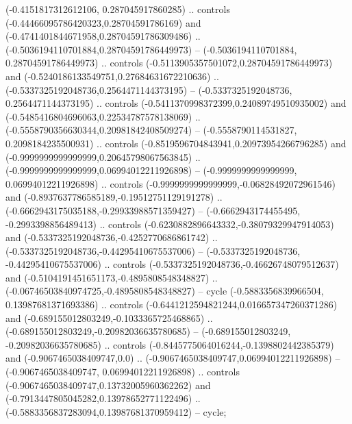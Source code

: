 (-0.4151817312612106, 0.287045917860285) .. controls (-0.44466095786420323,0.28704591786169) and (-0.4741401844671958,0.28704591786309486) .. (-0.5036194110701884,0.28704591786449973) --
(-0.5036194110701884, 0.28704591786449973) .. controls (-0.5113905357501072,0.28704591786449973) and (-0.5240186133549751,0.27684631672210636) .. (-0.5337325192048736,0.2564471144373195) --
(-0.5337325192048736, 0.2564471144373195) .. controls (-0.5411370998372399,0.24089749510935002) and (-0.5485416804696063,0.22534787578138069) .. (-0.5558790356630344,0.20981842408509274) --
(-0.5558790114531827, 0.2098184235500931) .. controls (-0.8519596704843941,0.20973954266796285) and (-0.9999999999999999,0.20645798067563845) .. (-0.9999999999999999,0.06994012211926898) --
(-0.9999999999999999, 0.06994012211926898) .. controls (-0.9999999999999999,-0.06828492072961546) and (-0.8937637786585189,-0.19512751129191278) .. (-0.6662943175035188,-0.29933988571359427) --
(-0.6662943174455495, -0.2993398856489413) .. controls (-0.6230882896643332,-0.38079329947914053) and (-0.5337325192048736,-0.4252770686861742) .. (-0.5337325192048736,-0.44295410675537006) --
(-0.5337325192048736, -0.44295410675537006) .. controls (-0.5337325192048736,-0.46626748079512637) and (-0.5104191451651173,-0.4895808548348827) .. (-0.06746503840974725,-0.4895808548348827) --
cycle
	(-0.5883356839966504, 0.13987681371693386) .. controls (-0.6441212594821244,0.016657347260371286) and (-0.689155012803249,-0.1033365725468865) .. (-0.689155012803249,-0.20982036635780685) --
(-0.689155012803249, -0.20982036635780685) .. controls (-0.8445775064016244,-0.1398802442385379) and (-0.9067465038409747,0.0) .. (-0.9067465038409747,0.06994012211926898) --
(-0.9067465038409747, 0.06994012211926898) .. controls (-0.9067465038409747,0.13732005960362262) and (-0.7913447805045282,0.13978652771122496) .. (-0.5883356837283094,0.13987681370959412) --
cycle;